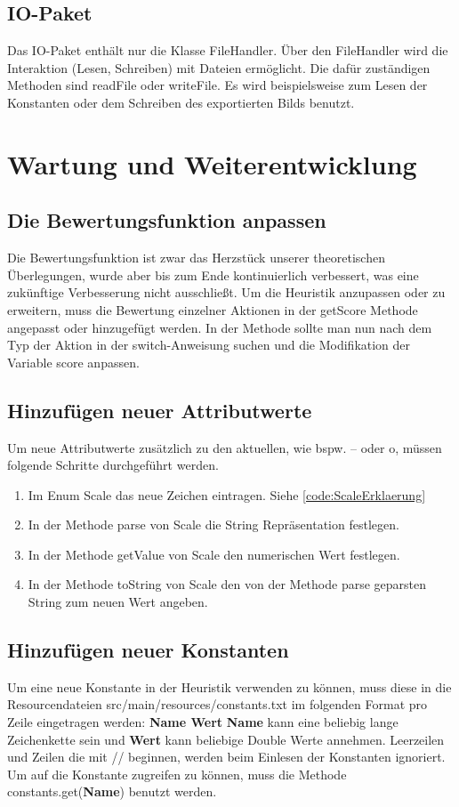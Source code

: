 \documentclass{article}
\newcommand{\fullref}[1]{\hyperref[{#1}]{\ref{#1} \nameref{#1}}} %
\newcommand{\gquote}[1]{\glqq #1\grqq} %
\begin{document}
\subsection{IO-Paket}
Das IO-Paket enthält nur die Klasse FileHandler. Über den FileHandler wird die Interaktion (Lesen, Schreiben) mit Dateien ermöglicht. Die dafür zuständigen Methoden sind readFile oder writeFile. Es wird beispielsweise zum Lesen der Konstanten oder dem Schreiben des exportierten Bilds benutzt.

\newpage

\section{Wartung und Weiterentwicklung}
\label{sec:Wartung}
\subsection {Die Bewertungsfunktion anpassen}
Die Bewertungsfunktion ist zwar das Herzstück unserer theoretischen Überlegungen,
wurde aber bis zum Ende kontinuierlich verbessert, was eine zukünftige Verbesserung
nicht ausschließt. \newline
Um die Heuristik anzupassen oder zu erweitern, muss die Bewertung einzelner Aktionen in der \gquote{getScore} Methode angepasst oder hinzugefügt werden. In der Methode sollte man nun nach dem Typ der Aktion in
der switch-Anweisung suchen und die Modifikation der Variable \gquote{score} anpassen.
\subsection {Hinzufügen neuer Attributwerte}
Um neue Attributwerte zusätzlich zu den aktuellen, wie bspw. \gquote{--} oder \gquote{o}, müssen folgende Schritte durchgeführt werden.
\begin{enumerate}
    \item Im Enum \gquote{Scale} das neue Zeichen eintragen. Siehe \fullref{code:ScaleErklaerung}
    \item In der Methode \gquote{parse} von Scale die String Repräsentation festlegen.
    \item In der Methode \gquote{getValue} von Scale den numerischen Wert festlegen.
    \item In der Methode \gquote{toString} von Scale den von der Methode \gquote{parse} geparsten String zum neuen Wert angeben.
\end{enumerate}
\subsection{Hinzufügen neuer Konstanten}
Um eine neue Konstante in der Heuristik verwenden zu können, muss diese in die Resourcendateien \gquote{src/main/resources/constants.txt} im folgenden Format pro Zeile eingetragen werden:
\newline
\textbf{Name Wert}
\newline
\textbf{Name} kann eine beliebig lange Zeichenkette sein und \textbf{Wert} kann beliebige Double Werte annehmen. Leerzeilen und Zeilen die mit \gquote{//} beginnen, werden beim Einlesen der Konstanten ignoriert. Um auf die Konstante zugreifen zu können, muss die Methode \gquote{constants.get(\textbf{Name})} benutzt werden.
\end{document}
